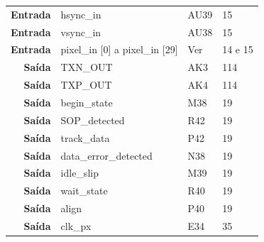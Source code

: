 \documentclass[11pt,a4paper]{article}
\begin{document}
\begin{table}[h!]
\begin{tabular}{rlll}
			\multicolumn{1}{r|}{\textbf{Entrada}} & hsync\_in                              & AU39                                     & 15                                         \\
			\multicolumn{1}{r|}{\textbf{Entrada}} & vsync\_in                              & AU38                                     & 15                                         \\
			\multicolumn{1}{r|}{\textbf{Entrada}} & pixel\_in {[}0{]} a pixel\_in {[}29{]} & Ver \cite{R041}                                & 14 e 15                                    \\
			\multicolumn{1}{r|}{\textbf{Saída}}   & TXN\_OUT                               & AK3                                      & 114                                        \\
			\multicolumn{1}{r|}{\textbf{Saída}}   & TXP\_OUT                               & AK4                                      & 114                                        \\
			\multicolumn{1}{r|}{\textbf{Saída}}   & begin\_state                           & M38                                      & 19                                         \\
			\multicolumn{1}{r|}{\textbf{Saída}}   & SOP\_detected                          & R42                                      & 19                                         \\
			\multicolumn{1}{r|}{\textbf{Saída}}   & track\_data                            & P42                                      & 19                                         \\
			\multicolumn{1}{r|}{\textbf{Saída}}   & data\_error\_detected                  & N38                                      & 19                                         \\
			\multicolumn{1}{r|}{\textbf{Saída}}   & idle\_slip                             & M39                                      & 19                                         \\
			\multicolumn{1}{r|}{\textbf{Saída}}   & wait\_state                            & R40                                      & 19                                         \\
			\multicolumn{1}{r|}{\textbf{Saída}}   & align                                  & P40                                      & 19                                         \\
			\multicolumn{1}{r|}{\textbf{Saída}}   & clk\_px                                & E34                                      & 35                                         \\

\end{tabular}
\end{table}
\end{document}
